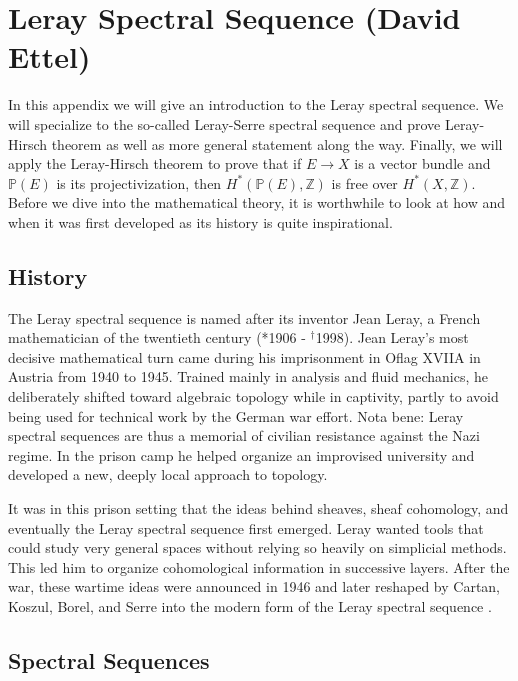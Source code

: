 \section{Leray Spectral Sequence (David Ettel)}
In this appendix we will give an introduction to the Leray spectral sequence. We will specialize to the so-called Leray-Serre spectral sequence and prove Leray-Hirsch theorem as well as more general statement along the way. Finally, we will apply the Leray-Hirsch theorem to prove that if $E \to X$ is a vector bundle and $\mathbb{P}(E)$ is its projectivization, then $H^\ast(\mathbb{P}(E),\mathbb{Z})$ is free over $H^\ast(X,\mathbb{Z})$. Before we dive into the mathematical theory, it is worthwhile to look at how and when it was first developed as its history is quite inspirational.


\subsection{History}
The Leray spectral sequence is named after its inventor Jean Leray, a French mathematician of the twentieth century (*1906 - $^\dagger$1998). 
 Jean Leray's most decisive mathematical turn came during his imprisonment in Oflag XVIIA in Austria from 1940 to 1945. Trained mainly in analysis and fluid mechanics, he deliberately shifted toward algebraic topology while in captivity, partly to avoid being used for technical work by the German war effort. Nota bene: Leray spectral sequences are thus a memorial of civilian resistance against the Nazi regime. In the prison camp he helped organize an improvised university and developed a new, deeply local approach to topology. 


 It was in this prison setting that the ideas behind sheaves, sheaf cohomology, and eventually the Leray spectral sequence first emerged. Leray wanted tools that could study very general spaces without relying so heavily on simplicial methods. This led him to organize cohomological information in successive layers. After the war, these wartime ideas were announced in 1946 and later reshaped by Cartan, Koszul, Borel, and Serre into the modern form of the Leray spectral sequence \cite{Miller}. 


\subsection{Spectral Sequences}
